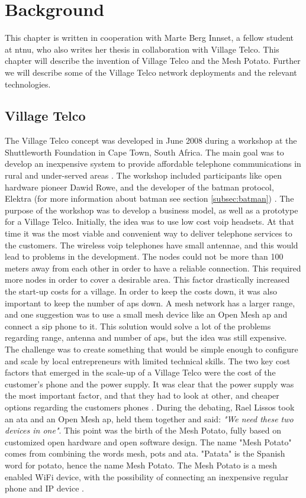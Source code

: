 \chapter{Background}
\label{chp:background} 

This chapter is written in cooperation with Marte Berg Innset, a fellow student at \gls{ntnu}, who also writes her thesis in collaboration with Village Telco. This chapter will describe the invention of Village Telco and the Mesh Potato. Further we will describe some of the Village Telco network deployments and the relevant technologies. 

\section{Village Telco}
The Village Telco concept was developed in June 2008 during a workshop at the Shuttleworth Foundation in Cape Town, South Africa. The main goal was to develop an inexpensive system to provide affordable telephone communications in rural and under-served areas \cite{MParticle}. The workshop included participants like open hardware pioneer Dawid Rowe, and the developer of the \gls{batman} protocol, Elektra (for more information about \gls{batman} see section \ref{subsec:batman}) \cite{MPworkshop}. The purpose of the workshop was to develop a business model, as well as a prototype for a Village Telco. Initially, the idea was to use low cost \gls{voip} headsets. At that time it was the most viable and convenient way to deliver telephone services to the customers. The wireless \gls{voip} telephones have small antennae, and this would lead to problems in the development. The nodes could not be more than 100 meters away from each other in order to have a reliable connection. This required more nodes in order to cover a desirable area. This factor drastically increased the start-up costs for a village. In order to keep the costs down, it was also important to keep the number of \glspl{ap} down. A mesh network has a larger range, and one suggestion was to use a small mesh device like an Open Mesh \gls{ap} and connect a \gls{sip} phone to it. This solution would solve a lot of the problems regarding range, antenna and number of \glspl{ap}, but the idea was still expensive. The challenge was to create something that would be simple enough to configure and scale by local entrepreneurs with limited technical skills. The two key cost factors that emerged in the scale-up of a Village Telco were the cost of the customer's phone and the power supply. It was clear that the power supply was the most important factor, and that they had to look at other, and cheaper options regarding the customers phones \cite{MPworkshop}. During the debating, Rael Lissos took an \gls{ata} and an Open Mesh \gls{ap}, held them together and said: \textit{"We need these two devices in one"}. This point was the birth of the Mesh Potato, fully based on customized open hardware and open software design. The name "Mesh Potato" comes from combining the words mesh, \gls{pots} and \gls{ata}. "Patata" is the Spanish word for potato, hence the name Mesh Potato. The Mesh Potato is a mesh enabled WiFi device, with the possibility of connecting an inexpensive regular phone and IP device \cite{MPorigin}.


